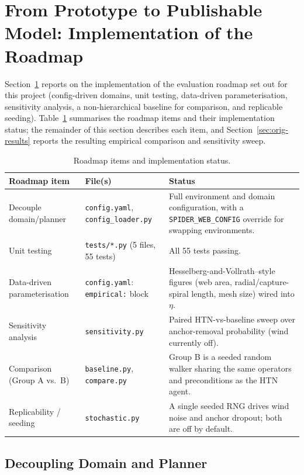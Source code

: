 \section{From Prototype to Publishable Model: Implementation of the Roadmap}
\label{sec:orig-roadmap}

Section~\ref{sec:orig-roadmap} reports on the implementation of the evaluation roadmap set out for this project (config-driven domains, unit testing, data-driven parameterisation, sensitivity analysis, a non-hierarchical baseline for comparison, and replicable seeding). Table~\ref{tab:orig-roadmap} summarises the roadmap items and their implementation status; the remainder of this section describes each item, and Section~\ref{sec:orig-results} reports the resulting empirical comparison and sensitivity sweep.

\begin{table}[H]
\centering
\caption{Roadmap items and implementation status.}
\label{tab:orig-roadmap}
\begin{tabular}{@{}p{3.2cm}p{4.3cm}p{6.8cm}@{}}
\toprule
\textbf{Roadmap item} & \textbf{File(s)} & \textbf{Status} \\
\midrule
Decouple domain/planner & \texttt{config.yaml}, \texttt{config\_loader.py} & Full environment and domain configuration, with a \texttt{SPIDER\_WEB\_CONFIG} override for swapping environments. \\
Unit testing & \texttt{tests/*.py} (5 files, 55 tests) & All 55 tests passing. \\
Data-driven parameterisation & \texttt{config.yaml}: \texttt{empirical:} block & Hesselberg-and-Vollrath--style figures (web area, radial/capture-spiral length, mesh size) wired into $\eta$. \\
Sensitivity analysis & \texttt{sensitivity.py} & Paired HTN-vs-baseline sweep over anchor-removal probability (wind currently off). \\
Comparison (Group A vs.\ B) & \texttt{baseline.py}, \texttt{compare.py} & Group B is a seeded random walker sharing the same operators and preconditions as the HTN agent. \\
Replicability / seeding & \texttt{stochastic.py} & A single seeded RNG drives wind noise and anchor dropout; both are off by default. \\
\bottomrule
\end{tabular}
\end{table}

\subsection{Decoupling Domain and Planner}
\label{sec:orig-decoupling}

